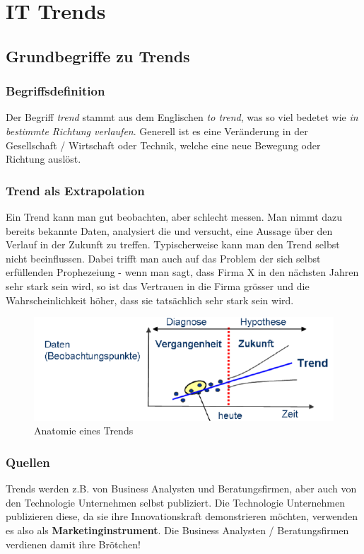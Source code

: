 \chapter{IT Trends}
\section{Grundbegriffe zu Trends}
\subsection{Begriffsdefinition}
Der Begriff \textit{trend} stammt aus dem Englischen \textit{to trend}, was so viel bedetet wie \textit{in bestimmte  Richtung verlaufen}. Generell ist es eine Veränderung in der Gesellschaft / Wirtschaft oder Technik, welche eine neue Bewegung oder Richtung auslöst.
\subsection{Trend als Extrapolation}
Ein Trend kann man gut beobachten, aber schlecht messen. Man nimmt dazu bereits bekannte Daten, analysiert die und versucht, eine Aussage über den Verlauf in der Zukunft zu treffen. Typischerweise kann man den Trend selbst nicht beeinflussen. Dabei trifft man auch auf das Problem der sich selbst erfüllenden Prophezeiung - wenn man sagt, dass Firma X in den nächsten Jahren sehr stark sein wird, so ist das Vertrauen in die Firma grösser und die Wahrscheinlichkeit höher, dass sie tatsächlich sehr stark sein wird.
\begin{figure}[h!]
\centering
\includegraphics[width=0.7\linewidth]{fig/trend}
\caption{Anatomie eines Trends}
\label{fig:trend}
\end{figure}
\subsection{Quellen}
Trends werden z.B. von Business Analysten und Beratungsfirmen, aber auch von den Technologie Unternehmen selbst publiziert. Die Technologie Unternehmen publizieren diese, da sie ihre Innovationskraft demonstrieren möchten, verwenden es also als \textbf{Marketinginstrument}. Die Business Analysten  / Beratungsfirmen verdienen damit ihre Brötchen!
